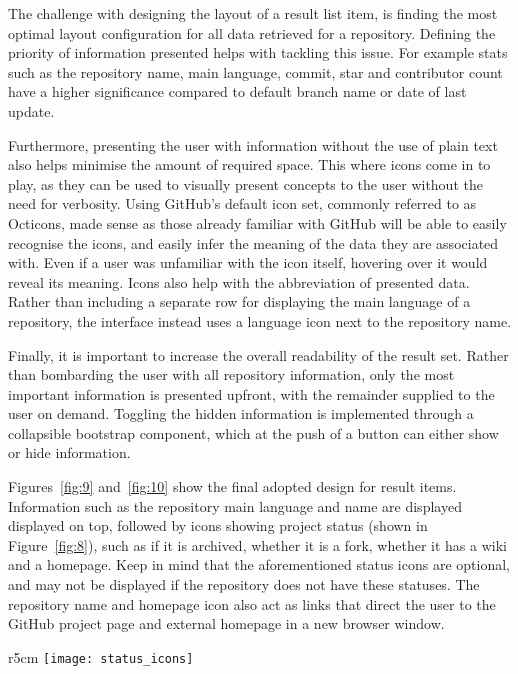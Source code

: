 The challenge with designing the layout of a result list item, is finding the most optimal layout configuration for all data retrieved for a repository.
Defining the priority of information presented helps with tackling this issue.
For example stats such as the repository name, main language, commit, star and contributor count have a higher significance compared to default branch name or date of last update.

Furthermore, presenting the user with information without the use of plain text also helps minimise the amount of required space.
This where icons come in to play, as they can be used to visually present concepts to the user without the need for verbosity.
Using GitHub's default icon set, commonly referred to as Octicons, made sense as those already familiar with GitHub will be able to easily recognise the icons, and easily infer the meaning of the data they are associated with.
Even if a user was unfamiliar with the icon itself, hovering over it would reveal its meaning.
Icons also help with the abbreviation of presented data.
Rather than including a separate row for displaying the main language of a repository, the interface instead uses a language icon next to the repository name.

Finally, it is important to increase the overall readability of the result set.
Rather than bombarding the user with all repository information, only the most important information is presented upfront, with the remainder supplied to the user on demand.
Toggling the hidden information is implemented through a collapsible bootstrap component, which at the push of a button can either show or hide information.

Figures~\ref{fig:9} and~\ref{fig:10} show the final adopted design for result items.
Information such as the repository main language and name are displayed displayed on top, followed by icons showing project status (shown in Figure~\ref{fig:8}), such as if it is archived, whether it is a fork, whether it has a wiki and a homepage.
Keep in mind that the aforementioned status icons are optional, and may not be displayed if the repository does not have these statuses.
The repository name and homepage icon also act as links that direct the user to the GitHub project page and external homepage in a new browser window.

\begin{wrapfigure}{r}{5cm}
    \centering
    \texttt{[image: status\_icons]}
    \caption[Status icons]{Status icons.}
    \label{fig:8}
\end{wrapfigure}

